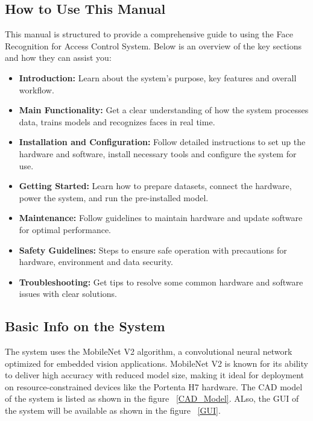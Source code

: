 \subsection{How to Use This Manual}

This manual is structured to provide a comprehensive guide to using the Face Recognition for Access Control System. Below is an overview of the key sections and how they can assist you:

\begin{itemize}
	\item \textbf{Introduction:}  
	Learn about the system’s purpose, key features and overall workflow.
	
	\item \textbf{Main Functionality:}  
	Get a clear understanding of how the system processes data, trains models and recognizes faces in real time.
	
	\item \textbf{Installation and Configuration:}  
	Follow detailed instructions to set up the hardware and software, install necessary tools and configure the system for use.
	
	\item \textbf{Getting Started:}  
	Learn how to prepare datasets, connect the hardware, power the system, and run the pre-installed model.
	
	\item \textbf{Maintenance:}  
	Follow guidelines to maintain hardware and update software for optimal performance.
	
	\item \textbf{Safety Guidelines:}  
	Steps to ensure safe operation with precautions for hardware, environment and data security.
	\item \textbf{Troubleshooting:} 
	Get tips to resolve some common hardware and software issues with clear solutions.
\end{itemize}


\subsection{Basic Info on the System}

The system uses the MobileNet V2 algorithm, a convolutional neural network optimized for embedded vision applications. MobileNet V2 is known for its ability to deliver high accuracy with reduced model size, making it ideal for deployment on resource-constrained devices like the Portenta H7 hardware. The CAD model of the system is listed as shown in the figure ~\ref{CAD_Model}. ALso, the GUI of the system will be available as shown in the figure ~\ref{GUI}.
\\

